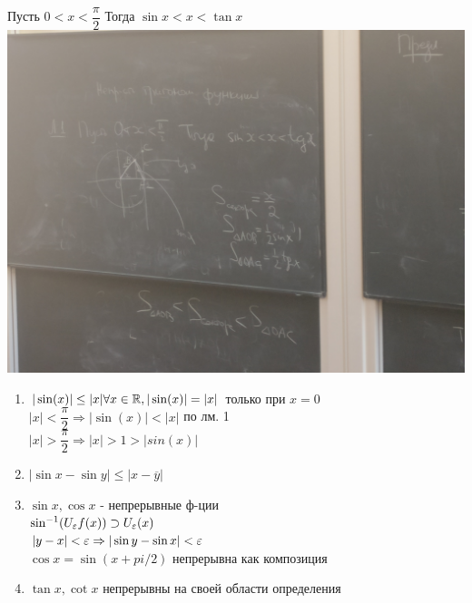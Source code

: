 \begin{lemma}
	Пусть $ 0 < x < \dfrac{\pi}{2} $ Тогда $ \sin x < x < \tan x $\\
	\includegraphics[width=0.9\linewidth]{IMG_20181015_142326}
\end{lemma}
\begin{consequence}
	\begin{enumerate}
	 \item 	$ |\sin(x) | \leq |x| \forall x \in \mathbb{R} , |\sin(x)| = | x| $ только при $x = 0$ \\
	 $ |x| < \dfrac{\pi}{2} \Rightarrow | \sin(x) | < |x| $ по лм. 1 \\
	 $ |x| > \dfrac{\pi}{2} \Rightarrow |x| > 1 > |sin(x)| $ 
	 \item $ |\sin x - \sin y | \leq | x - \overline{y} | $\\
	 \item $ \sin x, \cos x $ - непрерывные ф-ции\\
	 $ \sin^{-1} (U_{\varepsilon} f(x)) \supset U_{\varepsilon } (x) $\\
	 $ |y - x| < \varepsilon \Rightarrow |\sin y - \sin x| < \varepsilon $ \\
	 $ \cos x = \sin (x + pi / 2) $ непрерывна как композиция 
	 \item $ \tan x, \cot x $ непрерывны на своей области определения
	 
	\end{enumerate}

\end{consequence}

